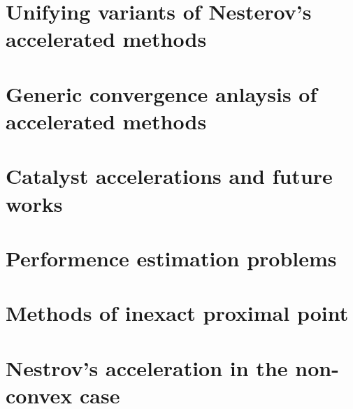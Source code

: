 \documentclass[12pt]{article}
\begin{document}
\section{Unifying variants of Nesterov's accelerated methods}
\section{Generic convergence anlaysis of accelerated methods}
\section{Catalyst accelerations and future works}
\section{Performence estimation problems}
\section{Methods of inexact proximal point}
\section{Nestrov's acceleration in the non-convex case}





\newpage

\appendix
\end{document}
